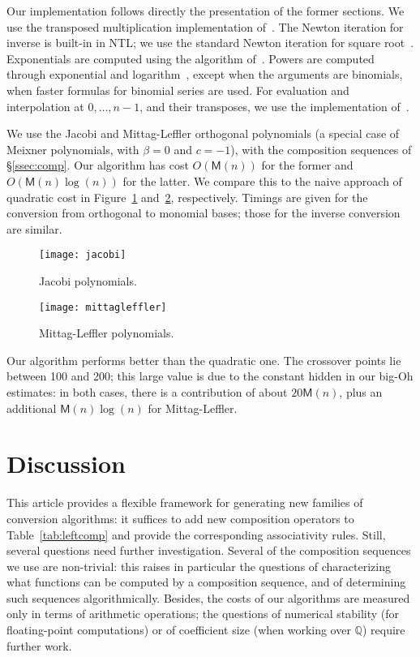 \documentclass{sig-alternate}
\def\Q {\ensuremath{\mathbb{Q}}}
\def\M{\ensuremath{\mathsf{M}}}
\begin{document}
Our implementation follows directly the presentation of the former
sections. We use the transposed multiplication implementation
of~\cite{BoLeSc03}. The Newton iteration for inverse is built-in in
NTL; we use the standard Newton iteration for square
root~\cite{Brent75}. Exponentials are computed using the algorithm
of~\cite{HaZi04}. Powers are computed through exponential and
logarithm~\cite{Brent75}, except when the arguments are binomials,
when faster formulas for binomial series are used. For evaluation and
interpolation at $0,\dots,n-1$, and their transposes, we use the
implementation of~\cite{BoLeSc03}.

We use the Jacobi and Mittag-Leffler orthogonal polynomials (a special
case of Meixner polynomials, with $\beta=0$ and $c=-1$), with the
composition sequences of \S\ref{ssec:comp}. Our algorithm has cost
$O(\M(n))$ for the former and $O(\M(n)\log(n))$ for the latter.  We
compare this to the naive approach of quadratic cost in
Figure~\ref{Fig:jacobi} and~\ref{Fig:mittag}, respectively. Timings
are given for the conversion from orthogonal to monomial bases; those
for the inverse conversion are similar.
\begin{figure}[!!!!!!!!!h]
\centerline{\texttt{[image: jacobi]}}
\vspace{-3ex}
\caption{{\small Jacobi polynomials.}}
\label{Fig:jacobi}
\end{figure}
\vspace{-5ex}
\begin{figure}[!!!!!!!!!h]
\centerline{\texttt{[image: mittagleffler]}}
\vspace{-3ex}
\caption{{\small Mittag-Leffler polynomials.}}
\label{Fig:mittag}
\end{figure}

Our algorithm performs better than the quadratic one. The crossover
points lie between 100 and 200; this large value is due to the
constant hidden in our big-Oh estimates: in both cases, there is a
contribution of about $20\M(n)$, plus an additional $\M(n)\log(n)$ for
Mittag-Leffler.





\section{Discussion}

This article provides a flexible framework for generating new families
of conversion algorithms: it suffices to add new composition operators
to Table~\ref{tab:leftcomp} and provide the corresponding
associativity rules.  Still, several questions need further
investigation. Several of the composition sequences we use are
non-trivial: this raises in particular the questions of characterizing
what functions can be computed by a composition sequence, and of
determining such sequences algorithmically.  Besides, the costs of our
algorithms are measured only in terms of arithmetic operations; the
questions of numerical stability (for floating-point computations) or
of coefficient size (when working over $\Q$) require further work.
\end{document}
